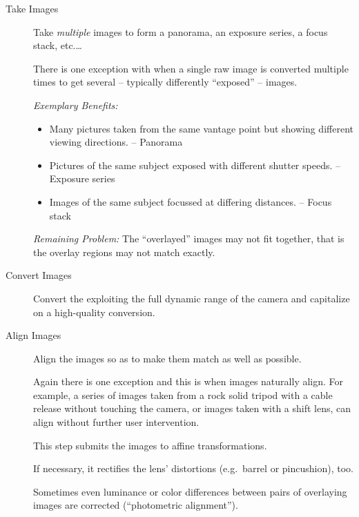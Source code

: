 \begin{description}
\item[Take Images]\itemend
  Take \emph{multiple} images to form a panorama, an exposure series, a focus stack, etc.\dots

  There is one exception with  when a single raw image is converted multiple
  times to get several -- typically differently ``exposed'' -- images.

  \noindent\emph{Exemplary Benefits:}

  \begin{itemize}
  \item
    Many pictures taken from the same vantage point but showing different viewing directions.
    -- Panorama

  \item
    Pictures of the same subject exposed with different shutter speeds.  -- Exposure series

  \item
    Images of the same subject focussed at differing distances.  -- Focus stack
  \end{itemize}

  \noindent\emph{Remaining Problem:} The ``overlayed'' images may not fit together, that is the
  overlay regions may not match exactly.

\item[Convert Images]\itemend
  Convert the  exploiting the full dynamic range of
  the camera and capitalize on a high-quality conversion.

\item[Align Images]\itemend
  Align the images so as to make them match as well as possible.

  Again there is one exception and this is when images naturally align.  For example, a series
  of images taken from a rock solid tripod with a cable release without touching the camera, or
  images taken with a shift lens, can align without further user intervention.

  This step submits the images to affine transformations.

  If necessary, it rectifies the lens' distortions
  (e.g.\ barrel or pincushion), too.

  Sometimes even luminance or color differences between pairs of overlaying images are corrected
  (``photometric alignment'').


\end{description}
